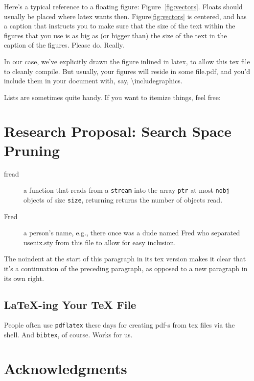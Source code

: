 Here's a typical reference to a floating figure:
Figure~\ref{fig:vectors}. Floats should usually be placed where latex
wants then. Figure\ref{fig:vectors} is centered, and has a caption
that instructs you to make sure that the size of the text within the
figures that you use is as big as (or bigger than) the size of the
text in the caption of the figures. Please do. Really.

In our case, we've explicitly drawn the figure inlined in latex, to
allow this tex file to cleanly compile. But usually, your figures will
reside in some file.pdf, and you'd include them in your document
with, say, \textbackslash{}includegraphics.

Lists are sometimes quite handy. If you want to itemize things, feel
free:

\section{Research Proposal: Search Space Pruning}

\begin{description}
  
\item[fread] a function that reads from a \texttt{stream} into the
  array \texttt{ptr} at most \texttt{nobj} objects of size
  \texttt{size}, returning returns the number of objects read.

\item[Fred] a person's name, e.g., there once was a dude named Fred
  who separated usenix.sty from this file to allow for easy
  inclusion.
\end{description}

\noindent
The noindent at the start of this paragraph in its tex version makes
it clear that it's a continuation of the preceding paragraph, as
opposed to a new paragraph in its own right.


\subsection{LaTeX-ing Your TeX File}

People often use \texttt{pdflatex} these days for creating pdf-s from
tex files via the shell. And \texttt{bibtex}, of course. Works for us.

\section*{Acknowledgments}

